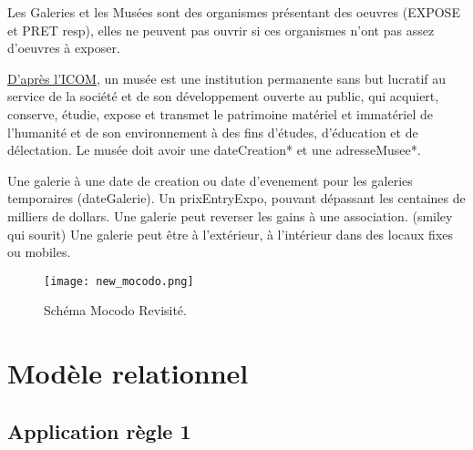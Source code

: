 \documentclass{article}
\begin{document}
Les Galeries et les Musées sont des organismes présentant des oeuvres (EXPOSE et PRET resp),
elles ne peuvent pas ouvrir si ces organismes n'ont pas assez d'oeuvres à exposer.

\href{https://fr.wikipedia.org/wiki/Musée}{D'après l'ICOM}, un musée est une institution permanente sans but lucratif au service de la société et de son développement ouverte au public, qui acquiert, conserve, étudie, expose et transmet le patrimoine matériel et immatériel de l’humanité et de son environnement à des fins d'études, d'éducation et de délectation. 
Le musée doit avoir une dateCreation* et une adresseMusee*.

Une galerie à une date de creation ou date d'evenement pour les galeries temporaires (dateGalerie).
Un prixEntryExpo, pouvant dépassant les centaines de milliers de dollars.
Une galerie peut reverser les gains à une association. (smiley qui sourit)
Une galerie peut être à l'extérieur, à l'intérieur dans des locaux fixes ou mobiles.




\begin{figure}[htp]
\centering
\texttt{[image: new\_mocodo.png]}
\caption{\label{fig:MCD_last}Schéma Mocodo Revisité.}
\end{figure}


\clearpage


\section{Modèle relationnel}
\subsection{Application règle 1}
\end{document}

